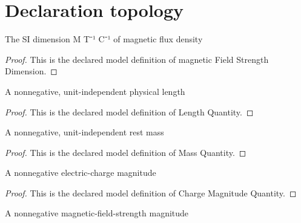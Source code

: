 \section{Declaration topology}
\begin{definition}
  \label{def:physics:phyx-mini-0540:phyxminiproblems-problemphyxmini0540-magneticfieldstrengthdimension}
  The SI dimension M T⁻¹ C⁻¹ of magnetic flux density
\end{definition}
\begin{proof}
  This is the declared model definition of magnetic Field Strength Dimension.
\end{proof}
\begin{definition}
  \label{def:physics:phyx-mini-0540:phyxminiproblems-problemphyxmini0540-lengthquantity}
  A nonnegative, unit-independent physical length
\end{definition}
\begin{proof}
  This is the declared model definition of Length Quantity.
\end{proof}
\begin{definition}
  \label{def:physics:phyx-mini-0540:phyxminiproblems-problemphyxmini0540-massquantity}
  A nonnegative, unit-independent rest mass
\end{definition}
\begin{proof}
  This is the declared model definition of Mass Quantity.
\end{proof}
\begin{definition}
  \label{def:physics:phyx-mini-0540:phyxminiproblems-problemphyxmini0540-chargemagnitudequantity}
  A nonnegative electric-charge magnitude
\end{definition}
\begin{proof}
  This is the declared model definition of Charge Magnitude Quantity.
\end{proof}
\begin{definition}
  \label{def:physics:phyx-mini-0540:phyxminiproblems-problemphyxmini0540-magneticfieldstrengthquantity}
  A nonnegative magnetic-field-strength magnitude
\end{definition}
